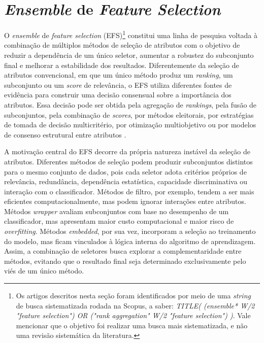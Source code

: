 \section{\textit{Ensemble} de \textit{Feature Selection}}\label{ensambleFS}

O \textit{ensemble} de \textit{feature selection} (EFS)\footnote{Os artigos descritos nesta seção foram identificados por meio de uma \textit{string} de busca sistematizada rodada na Scopus, a saber: \textit{TITLE( (ensemble* W/2 "feature selection") OR ("rank aggregation" W/2 "feature selection") )}. Vale mencionar que o objetivo foi realizar uma busca mais sistematizada, e não uma revisão sistemática da literatura.} constitui uma linha de pesquisa voltada à combinação de múltiplos métodos de seleção de atributos com o objetivo de reduzir a dependência de um único seletor, aumentar a robustez do subconjunto final e melhorar a estabilidade dos resultados. Diferentemente da seleção de atributos convencional, em que um único método produz um \textit{ranking}, um subconjunto ou um \textit{score} de relevância, o EFS utiliza diferentes fontes de evidência para construir uma decisão consensual sobre a importância dos atributos. Essa decisão pode ser obtida pela agregação de \textit{rankings}, pela fusão de subconjuntos, pela combinação de \textit{scores}, por métodos eleitorais, por estratégias de tomada de decisão multicritério, por otimização multiobjetivo ou por modelos de consenso estrutural entre atributos \cite{bolon2018scalability,mera2021framework,seijopardo2019automatic}.

A motivação central do EFS decorre da própria natureza instável da seleção de atributos. Diferentes métodos de seleção podem produzir subconjuntos distintos para o mesmo conjunto de dados, pois cada seletor adota critérios próprios de relevância, redundância, dependência estatística, capacidade discriminativa ou interação com o classificador. Métodos de filtro, por exemplo, tendem a ser mais eficientes computacionalmente, mas podem ignorar interações entre atributos. Métodos \textit{wrapper} avaliam subconjuntos com base no desempenho de um classificador, mas apresentam maior custo computacional e maior risco de \textit{overfitting}. Métodos \textit{embedded}, por sua vez, incorporam a seleção ao treinamento do modelo, mas ficam vinculados à lógica interna do algoritmo de aprendizagem. Assim, a combinação de seletores busca explorar a complementaridade entre métodos, evitando que o resultado final seja determinado exclusivamente pelo viés de um único método.

